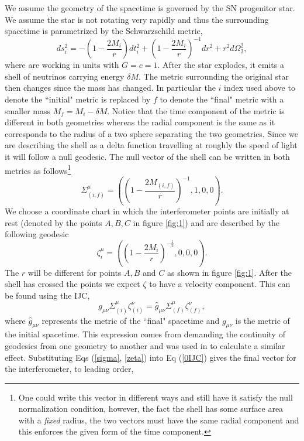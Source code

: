 \documentclass[aps,showpacs,onecolumn,floats,prd,superscriptaddress,nofootinbib]{revtex4-1}
\begin{document}
We assume the geometry of the spacetime is governed by the SN progenitor star. We assume the star is not rotating very rapidly and thus the surrounding spacetime is parametrized by the Schwarzschild metric,
\begin{equation}
	ds^2_i = - \left( 1 - \frac{2M_i}{r} \right) dt_i^2 + \left( 1 - \frac{2M_i}{r} \right)^{-1} dr^2 + r^2 d \Omega_2^2,	\label{SCH}
\end{equation}
where are working in units with $G = c =1$. After the star explodes, it emits a shell of neutrinos carrying energy $\delta M$. The metric surrounding the original star then changes since the mass has changed. In particular the $i$ index used above to denote the ``initial" metric is replaced by $f$ to denote the ``final" metric with a smaller mass $M _f = M_i -\delta M$. Notice that the time component of the metric is different in both geometries whereas the radial component is the same as it corresponds to the radius of a two sphere separating the two geometries.  Since we are describing the shell as a delta function travelling at roughly the speed of light it will follow a null geodesic. The null vector of the shell can be written in both metrics as follows\footnote{One could write this vector in different ways and still have it satisfy the null normalization condition, however, the fact the shell has some surface area with a \emph{fixed} radius, the two vectors must have the same radial component and this enforces the given form of the time component.}
\begin{equation}
	\Sigma^\mu_{(i,f)} = \left( \left( 1 - \frac{2M_{(i,f)}}{r} \right)^{-1}, 1, 0, 0 \right).	\label{sigma}
\end{equation}
We choose a coordinate chart in which the interferometer points are initially at rest (denoted by the points $A,B,C$ in figure \ref{fig:1}) and are described by the following geodesic
\begin{equation}
	\zeta^\mu_{i} = \left( \left( 1 - \frac{2M_i}{r} \right)^{-\frac{1}{2}}, 0, 0, 0 \right).	\label{zeta}
\end{equation}
The $r$ will be different for points $A,B$ and $C$ as shown in figure \ref{fig:1}. After the shell has crossed the points we expect $\zeta$ to have a velocity component. This can be found using the IJC, 
\begin{equation}
	 g_{\mu \nu} \Sigma^\mu_{(i)} \zeta_{(i)}^\nu = \hat{g}_{\mu \nu} \Sigma^\mu_{(f)} \zeta_{(f)}^\nu,	\label{0IJC}
\end{equation}
where $\hat{g}_{\mu \nu}$ represents the metric of the ``final" spacetime and $g_{\mu \nu}$ is the metric of the initial spacetime. This expression comes from demanding the continuity of geodesics from one geometry to another and was used in \cite{PhysRevD.93.103006} to calculate a similar effect. Substituting Eqs (\ref{sigma}, \ref{zeta}) into Eq (\ref{0IJC}) gives the final vector for the interferometer, to leading order,
\end{document}
